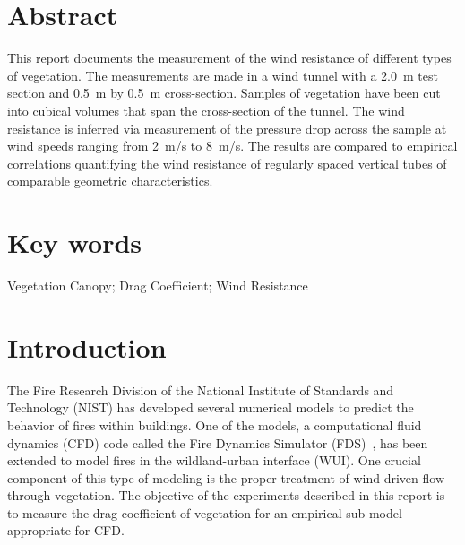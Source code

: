 \documentclass[12pt]{article}
\begin{document}
\pagestyle{plain}

\section*{Abstract}

This report documents the measurement of the wind resistance of different types of vegetation. The measurements are made in a wind tunnel with a 2.0~\si{m} test section and 0.5~\si{m} by 0.5~\si{m} cross-section. Samples of vegetation have been cut into cubical volumes that span the cross-section of the tunnel. The wind resistance is inferred via measurement of the pressure drop across the sample at wind speeds ranging from 2~\si{m/s} to 8~\si{m/s}. The results are compared to empirical correlations quantifying the wind resistance of regularly spaced vertical tubes of comparable geometric characteristics.

\section*{Key words}

Vegetation Canopy; Drag Coefficient; Wind Resistance

\cleardoublepage

\begin{center}
	\tableofcontents
\end{center}

\cleardoublepage

\begin{center}
	\listoftables
	\listoffigures
\end{center}

\cleardoublepage

\pagestyle{plain}


\section{Introduction}
\label{sec:intro}

The Fire Research Division of the National Institute of Standards and Technology (NIST) has developed several numerical models to predict the behavior of fires within buildings. One of the models, a computational fluid dynamics (CFD) code called the Fire Dynamics Simulator (FDS)~\cite{FDS_Tech_Guide}, has been extended to model fires in the wildland-urban interface (WUI). One crucial component of this type of modeling is the proper treatment of wind-driven flow through vegetation. The objective of the experiments described in this report is to measure the drag coefficient of vegetation for an empirical sub-model appropriate for CFD.
\end{document}
